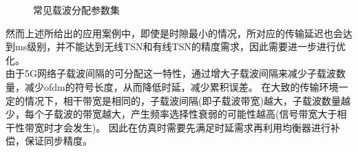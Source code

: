 \documentclass[UTF8,a4paper,12pt]{ctexart}
\numberwithin{equation}{section}
\begin{document}
\begin{figure}[htb]
	\caption{\label{1} 常见载波分配参数集}
\end{figure}
然而上述所给出的应用案例中，即使是时隙最小的情况，所对应的传输延迟也会达到ms级别，并不能达到无线TSN和有线TSN的精度需求，因此需要进一步进行优化。\\
由于5G网络子载波间隔的可分配这一特性，通过增大子载波间隔来减少子载波数量，减少ofdm的符号长度，从而降低时延，减少累积误差。
在大致的传输环境一定的情况下，相干带宽是相同的，子载波间隔(即子载波带宽)越大，子载波数量越少，每个子载波的带宽越大，产生频率选择性衰弱的可能性越高(信号带宽大于相干性带宽时才会发生)。 因此在仿真时需要先满足时延需求再利用均衡器进行补偿，保证同步精度。
\end{document}

